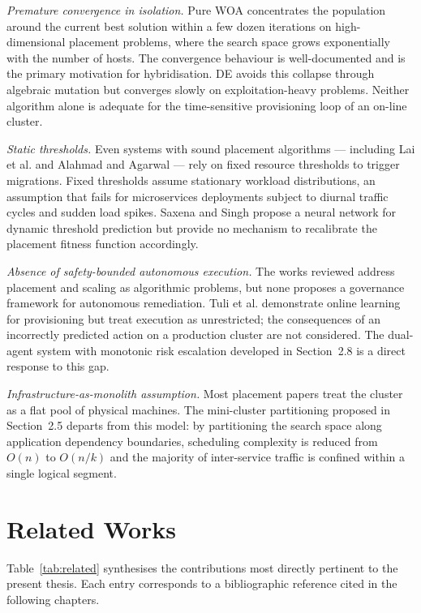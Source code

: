 \documentclass[12pt,a4paper]{report}
\begin{document}
\textit{Premature convergence in isolation.} Pure WOA \cite{mirjalili2016woa}
concentrates the population around the current best solution within a few dozen
iterations on high-dimensional placement problems, where the search space grows
exponentially with the number of hosts. The convergence behaviour is well-documented
and is the primary motivation for hybridisation. DE \cite{storn1997de} avoids this
collapse through algebraic mutation but converges slowly on exploitation-heavy problems.
Neither algorithm alone is adequate for the time-sensitive provisioning loop of an
on-line cluster.

\textit{Static thresholds.} Even systems with sound placement algorithms --- including
Lai et al. \cite{lai2025energy} and Alahmad and Agarwal \cite{alahmad2024multiple} ---
rely on fixed resource thresholds to trigger migrations. Fixed thresholds assume
stationary workload distributions, an assumption that fails for microservices
deployments subject to diurnal traffic cycles and sudden load spikes. Saxena and Singh
\cite{saxena2022proactive} propose a neural network for dynamic threshold prediction
but provide no mechanism to recalibrate the placement fitness function accordingly.

\textit{Absence of safety-bounded autonomous execution.} The works reviewed address
placement and scaling as algorithmic problems, but none proposes a governance framework
for autonomous remediation. Tuli et al. \cite{tuli2023cilp} demonstrate online
learning for provisioning but treat execution as unrestricted; the consequences of an
incorrectly predicted action on a production cluster are not considered. The dual-agent
system with monotonic risk escalation developed in Section~2.8 is a direct response to
this gap.

\textit{Infrastructure-as-monolith assumption.} Most placement papers treat the
cluster as a flat pool of physical machines. The mini-cluster partitioning proposed
in Section~2.5 departs from this model: by partitioning the search space along
application dependency boundaries, scheduling complexity is reduced from $O(n)$ to
$O(n/k)$ and the majority of inter-service traffic is confined within a single
logical segment.

\section{Related Works}

Table~\ref{tab:related} synthesises the contributions most directly pertinent to the
present thesis. Each entry corresponds to a bibliographic reference cited in the
following chapters.
\end{document}
